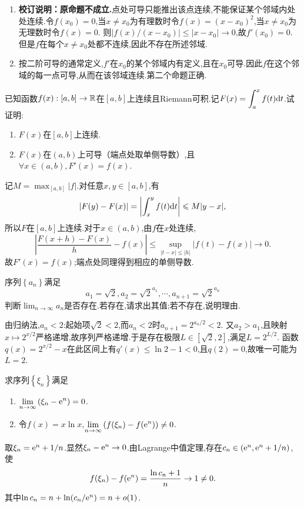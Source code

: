 \documentclass{ctexart}
\begin{document}
\begin{solution}
\begin{enumerate}[label=\textbf{(\arabic*)}]
\item \textbf{校订说明：原命题不成立.}点处可导只能推出该点连续,不能保证某个邻域内处处连续.令$f(x_0)=0$,当$x\neq x_0$为有理数时令$f(x)=(x-x_0)^2$,当$x\neq x_0$为无理数时令$f(x)=0$.
则$|f(x)/(x-x_0)|\leqslant|x-x_0|\to0$,故$f'(x_0)=0$.
但是$f$在每个$x\neq x_0$处都不连续,因此不存在所述邻域.
\item 按二阶可导的通常定义,$f'$在$x_0$的某个邻域内有定义,且在$x_0$可导.因此$f$在这个邻域的每一点可导,从而在该邻域连续.第二个命题正确.
\end{enumerate}
\end{solution}
\begin{problem}[7.(10\songti{分})]
已知函数$f(x):[a,b]\to\mathbb{R}$在$[a,b]$上连续且Riemann可积.记$\displaystyle F(x)=\int_a^xf(t)\mathrm{d} t$.试证明:
        \begin{enumerate}[label=\textbf{(\arabic*)}]
            \item $F(x)$在$[a,b]$上连续.
            \item $F(x)$在$(a,b)$上可导（端点处取单侧导数）,且$\forall x\in(a,b),F'(x)=f(x)$.
        \end{enumerate}
\end{problem}
\begin{solution}
记$M=\max_{[a,b]}|f|$.对任意$x,y\in[a,b]$,有
\[|F(y)-F(x)|=\left|\int_x^yf(t)\mathrm{d} t\right|\leqslant M|y-x|,\]
所以$F$在$[a,b]$上连续.对于$x\in(a,b)$,由$f$在$x$处连续,
\[\left|\dfrac{F(x+h)-F(x)}h-f(x)\right|
\leqslant\sup_{|t-x|\leqslant|h|}|f(t)-f(x)|\to0.\]
故$F'(x)=f(x)$;端点处同理得到相应的单侧导数.
\end{solution}
\begin{problem}[8.(10\songti{分})]
序列$\left\{a_n\right\}$满足
        $$a_1=\sqrt{2},a_2=\sqrt{2}^{a_1},\cdots,a_{n+1}=\sqrt{2}^{a_n}$$
        判断$\displaystyle\lim_{n\to\infty}a_n$是否存在.若存在,请求出其值;若不存在,说明理由.
\end{problem}
\begin{solution}
由归纳法,$a_n<2$:起始项$\sqrt2<2$,而$a_n<2$时$a_{n+1}=2^{a_n/2}<2$.
又$a_2>a_1$,且映射$x\mapsto2^{x/2}$严格递增,故序列严格递增.于是存在极限$L\in[\sqrt2,2]$,满足$L=2^{L/2}$.
函数$q(x)=2^{x/2}-x$在此区间上有$q'(x)\leqslant\ln2-1<0$,且$q(2)=0$,故唯一可能为$L=2$.
\end{solution}
\begin{problem}[9.(10\songti{分})]
求序列$\left\{\xi_n\right\}$满足
        \begin{enumerate}[label=\textbf{(\alph*)}]
            \item $\displaystyle\lim_{n\to\infty}\left(\xi_n-\mathrm{e}^n\right)=0$.
            \item 令$f(x)=x\ln x$,$\displaystyle\lim_{n\to\infty}{\left(f(\xi_n)-f(\mathrm{e}^n)\right)}\neq0$.
        \end{enumerate}
\end{problem}
\begin{solution}
取$\xi_n=\mathrm{e}^n+1/n$.显然$\xi_n-\mathrm{e}^n\to0$.由Lagrange中值定理,存在$c_n\in(\mathrm{e}^n,\mathrm{e}^n+1/n)$,使
\[f(\xi_n)-f(\mathrm{e}^n)=\dfrac{\ln c_n+1}{n}\to1\neq0.\]
其中$\ln c_n=n+\ln(c_n/\mathrm{e}^n)=n+o(1)$.
\end{solution}
\end{document}
